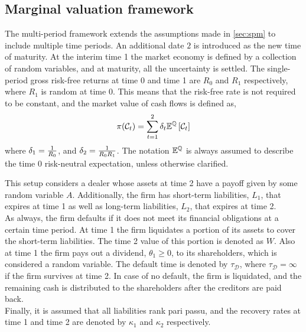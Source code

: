 \documentclass[main.tex]{subfiles}
\begin{document}
    \subsection{Marginal valuation framework}
        The multi-period framework extends the assumptions made in \cref{sec:spm} to include multiple time periods.
        An additional date $2$ is introduced as the new time of maturity.
        At the interim time 1 the market economy is defined by a collection of random variables,
        and at maturity, all the uncertainty is settled. 
        The single-period gross risk-free returns at time 0 and time 1 are $R_0$ and $R_1$ respectively, where $R_1$ is random at time 0.
        This means that the risk-free rate is not required to be constant,
        and the market value of cash flows is defined as,
        \begin{equation}
        \pi(\mathcal{C}_{t}) = \sum_{t=1}^{2}\delta_t \mathbb{E}^{\mathbb{Q}}\left[\mathcal{C}_{t}\right]
        \end{equation}
        where $\delta_1 = \frac{1}{R_{0}}$,
        and $\delta_2 = \frac{1}{R_{0}R_{1}}$.
        The notation $\mathbb{E}^{\mathbb{Q}}$ is always assumed to describe the time 0 risk-neutral expectation, unless otherwise clarified.

        This setup considers a dealer whose assets at time 2 have a payoff given by some random variable $A$.
        Additionally, the firm has short-term liabilities, $L_1$, that expires at time 1 as well as long-term liabilities, $L_2$, that expires at time 2.
        \\
        As always, the firm defaults if it does not meet its financial obligations at a certain time period.
        At time 1 the firm liquidates a portion of its assets to cover the short-term liabilities.
        The time 2 value of this portion is denoted as $W$.
        Also at time 1 the firm pays out a dividend, $\theta_1 \geq 0$, to its shareholders,
        which is considered a random variable.
        The default time is denoted by $\tau_{\mathcal{D}}$,
        where $\tau_{\mathcal{D}} = \infty$ if the firm survives at time 2.
        In case of no default, the firm is liquidated, and the remaining cash is distributed to the shareholders after the creditors are paid back.
        \\
        Finally, it is assumed that all liabilities rank pari passu,
        and the recovery rates at time 1 and time 2 are denoted by $\kappa_1$ and $\kappa_2$ respectively.
\end{document}
